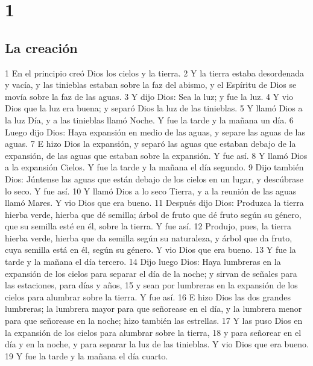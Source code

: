 

\chapter{1}

\section*{La creación}

1 En el principio creó Dios los cielos y la tierra.
2 Y la tierra estaba desordenada y vacía, y las tinieblas estaban sobre la faz del abismo, y el Espíritu de Dios se movía sobre la faz de las aguas.
3 Y dijo Dios: Sea la luz; y fue la luz.
4 Y vio Dios que la luz era buena; y separó Dios la luz de las tinieblas.
5 Y llamó Dios a la luz Día, y a las tinieblas llamó Noche. Y fue la tarde y la mañana un día.
6 Luego dijo Dios: Haya expansión en medio de las aguas, y separe las aguas de las aguas.
7 E hizo Dios la expansión, y separó las aguas que estaban debajo de la expansión, de las aguas que estaban sobre la expansión. Y fue así.
8 Y llamó Dios a la expansión Cielos. Y fue la tarde y la mañana el día segundo.
9 Dijo también Dios: Júntense las aguas que están debajo de los cielos en un lugar, y descúbrase lo seco. Y fue así.
10 Y llamó Dios a lo seco Tierra, y a la reunión de las aguas llamó Mares. Y vio Dios que era bueno.
11 Después dijo Dios: Produzca la tierra hierba verde, hierba que dé semilla; árbol de fruto que dé fruto según su género, que su semilla esté en él, sobre la tierra. Y fue así.
12 Produjo, pues, la tierra hierba verde, hierba que da semilla según su naturaleza, y árbol que da fruto, cuya semilla está en él, según su género. Y vio Dios que era bueno.
13 Y fue la tarde y la mañana el día tercero.
14 Dijo luego Dios: Haya lumbreras en la expansión de los cielos para separar el día de la noche; y sirvan de señales para las estaciones, para días y años,
15 y sean por lumbreras en la expansión de los cielos para alumbrar sobre la tierra. Y fue así.
16 E hizo Dios las dos grandes lumbreras; la lumbrera mayor para que señorease en el día, y la lumbrera menor para que señorease en la noche; hizo también las estrellas.
17 Y las puso Dios en la expansión de los cielos para alumbrar sobre la tierra,
18 y para señorear en el día y en la noche, y para separar la luz de las tinieblas. Y vio Dios que era bueno.
19 Y fue la tarde y la mañana el día cuarto.
